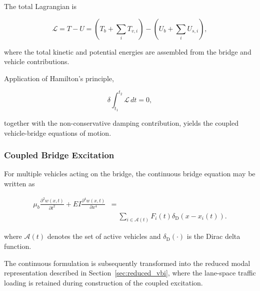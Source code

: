 \documentclass[journal]{IEEEtran}
\begin{document}
The total Lagrangian is

\begin{equation}
\mathcal{L}
=
T-U
=
\left(
T_b+\sum_i T_{v,i}
\right)
-
\left(
U_b+\sum_i U_{s,i}
\right),
\end{equation}

where the total kinetic and potential energies are assembled from the
bridge and vehicle contributions.

Application of Hamilton's principle,

\begin{equation}
\delta
\int_{t_1}^{t_2}
\mathcal{L}\,dt
=
0,
\end{equation}

together with the non-conservative damping contribution, yields the
coupled vehicle-bridge equations of motion.


\subsubsection{Coupled Bridge Excitation}

For multiple vehicles acting on the bridge, the continuous bridge
equation may be written as

\begin{equation}
\begin{aligned}
\mu_b
\frac{\partial^2 w(x,t)}{\partial t^2}
+
EI
\frac{\partial^4 w(x,t)}{\partial x^4}
&=
\\[-0.2em]
&\quad
\sum_{i\in\mathcal{A}(t)}
F_i(t)
\delta_{\mathrm{D}}
\left(
x-x_i(t)
\right).
\end{aligned}
\end{equation}

where $\mathcal{A}(t)$ denotes the set of active vehicles and $\delta_{\mathrm{D}}(\cdot)$ is the Dirac delta function.

The continuous formulation is subsequently transformed into the reduced
modal representation described in Section~\ref{sec:reduced_vbi}, where the lane-space traffic
loading is retained during construction of the coupled excitation.
\end{document}
